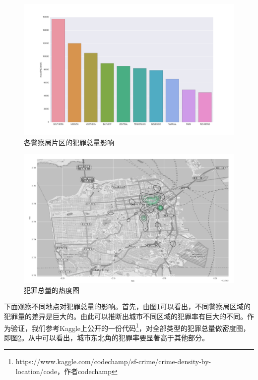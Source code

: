 \begin{figure}[tb]
    \centering
    \includegraphics[width=1.0\linewidth]{fig/PdDistrict}
    \caption{各警察局片区的犯罪总量影响}
    \label{fig:pd_district}
\end{figure}

\begin{figure}[tb]
    \centering
    \includegraphics[width=1.0\linewidth]{fig/total_density}
    \caption{犯罪总量的热度图}
    \label{fig:tot_density}
\end{figure}

下面观察不同地点对犯罪总量的影响。首先，由图\ref{fig:pd_district}可以看出，不同警察局区域的犯罪量的差异是巨大的。由此可以推断出城市不同区域的犯罪率有巨大的不同。作为验证，我们参考Kaggle上公开的一份代码\footnote{https://www.kaggle.com/codechamp/sf-crime/crime-density-by-location/code，作者codechamp}，对全部类型的犯罪总量做密度图，即图\ref{fig:tot_density}。从中可以看出，城市东北角的犯罪率要显著高于其他部分。

